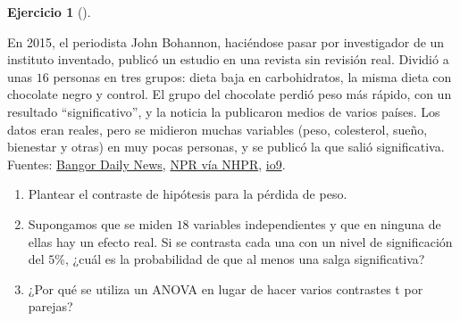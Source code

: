 \documentclass[
  spanish,
  a4paper,
]{scrreport}
\theoremstyle{definition}
\newtheorem{exercise}{Ejercicio}[chapter]
\theoremstyle{remark}
\begin{document}
\begin{exercise}[]\protect\hypertarget{exr-interpretacion-chocolate-adelgaza}{}\label{exr-interpretacion-chocolate-adelgaza}

En 2015, el periodista John Bohannon, haciéndose pasar por investigador
de un instituto inventado, publicó un estudio en una revista sin
revisión real. Dividió a unas \(16\) personas en tres grupos: dieta baja
en carbohidratos, la misma dieta con chocolate negro y control. El grupo
del chocolate perdió peso más rápido, con un resultado
``significativo'', y la noticia la publicaron medios de varios países.
Los datos eran reales, pero se midieron muchas variables (peso,
colesterol, sueño, bienestar y otras) en muy pocas personas, y se
publicó la que salió significativa. Fuentes:
\href{https://www.bangordailynews.com/2015/05/28/news/journalist-tests-media-on-false-study-touting-chocolate-makes-you-thin/}{Bangor
Daily News},
\href{https://www.nhpr.org/national/2015-05-29/trickster-journalist-explains-why-he-duped-the-media-on-chocolate-study}{NPR
vía NHPR},
\href{https://io9.gizmodo.com/i-fooled-millions-into-thinking-chocolate-helps-weight-1707251800}{io9}.

\begin{enumerate}
\def\labelenumi{\alph{enumi}.}
\item
  Plantear el contraste de hipótesis para la pérdida de peso.
\item
  Supongamos que se miden \(18\) variables independientes y que en
  ninguna de ellas hay un efecto real. Si se contrasta cada una con un
  nivel de significación del \(5\)\%, ¿cuál es la probabilidad de que al
  menos una salga significativa?
\item
  ¿Por qué se utiliza un ANOVA en lugar de hacer varios contrastes t por
  parejas?
\end{enumerate}

\end{exercise}
\end{document}
